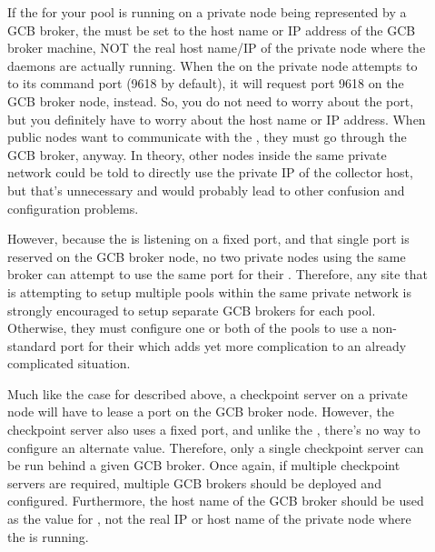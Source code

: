 \begin{description}


\item[]
  If the  for your pool is running on a private node
  being represented by a GCB broker, the 
  must be set to the host name or IP address of the GCB broker machine,
  NOT the real host name/IP of the private node where the daemons are
  actually running.
  When the  on the private node attempts to
   to its command port (9618 by default), it will
  request port 9618 on the GCB broker node, instead.
  So, you do not need to worry about the port, but you definitely have
  to worry about the host name or IP address.
  When public nodes want to communicate with the ,
  they must go through the GCB broker, anyway.
  In theory, other nodes inside the same private network could be told
  to directly use the private IP of the collector host, but that's
  unnecessary and would probably lead to other confusion and
  configuration problems.

  However, because the  is listening on a fixed
  port, and that single port is reserved on the GCB broker node, no
  two private nodes using the same broker can attempt to use the same
  port for their .
  Therefore, any site that is attempting to setup multiple pools
  within the same private network is strongly encouraged to setup
  separate GCB brokers for each pool.
  Otherwise, they must configure one or both of the pools to use a
  non-standard port for their  which adds yet more
  complication to an already complicated situation. 

\item[]
  Much like the case for  described above,
  a checkpoint server on a private node will have to lease a port on
  the GCB broker node.
  However, the checkpoint server also uses a fixed port, and unlike
  the , there's no way to configure an alternate
  value.
  Therefore, only a single checkpoint server can be run behind a given
  GCB broker.
  Once again, if multiple checkpoint servers are required, multiple
  GCB brokers should be deployed and configured.
  Furthermore, the host name of the GCB broker should be used as the
  value for , not the real IP or host name
  of the private node where the  is running.


\end{description}
